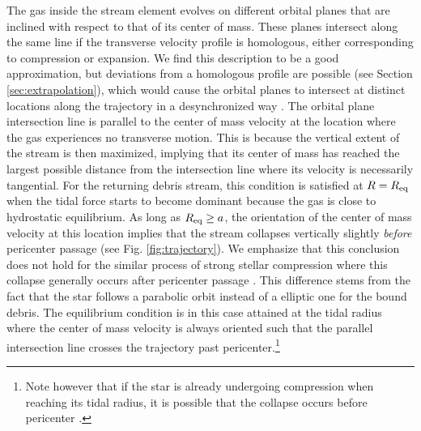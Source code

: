 \documentclass[a4paper,fleqn,usenatbib]{mnras}
\begin{document}
The gas inside the stream element evolves on different orbital planes that are inclined with respect to that of its center of mass. These planes intersect along the same line if the transverse velocity profile is homologous, either corresponding to compression or expansion. We find this description to be a good approximation, but deviations from a homologous profile are possible (see Section \ref{sec:extrapolation}), which would cause the orbital planes to intersect at distinct locations along the trajectory in a desynchronized way \citep{stone2013}. The orbital plane intersection line is parallel to the center of mass velocity at the location where the gas experiences no transverse motion. This is because the vertical extent of the stream is then maximized, implying that its center of mass has reached the largest possible distance from the intersection line where its velocity is necessarily tangential. For the returning debris stream, this condition is satisfied at $R=R_{\rm eq}$ when the tidal force starts to become dominant because the gas is close to hydrostatic equilibrium. As long as $R_{\rm eq} \geq a$, the orientation of the center of mass velocity at this location implies that the stream collapses vertically slightly \textit{before} pericenter passage (see Fig. \ref{fig:trajectory}). We emphasize that this conclusion does not hold for the similar process of strong stellar compression where this collapse generally occurs after pericenter passage \citep{luminet1985}. This difference stems from the fact that the star follows a parabolic orbit instead of a elliptic one for the bound debris. The equilibrium condition is in this case attained at the tidal radius where the center of mass velocity is always oriented such that the parallel intersection line crosses the trajectory past pericenter.\footnote{Note however that if the star is already undergoing compression when reaching its tidal radius, it is possible that the collapse occurs before pericenter \citetext{see panel (d) in figure 7 of the paper by \citealt{stone2013} for an example}.}
\end{document}
